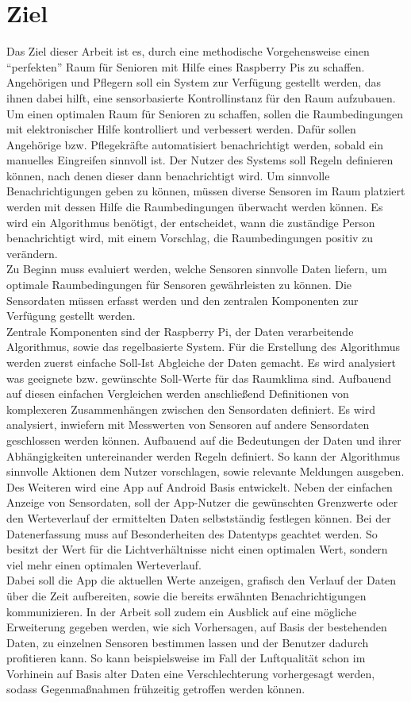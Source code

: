 \section{Ziel}
Das Ziel dieser Arbeit ist es, durch eine methodische Vorgehensweise einen ``perfekten'' Raum für Senioren mit Hilfe eines Raspberry Pis zu schaffen. Angehörigen und Pflegern soll ein System zur Verfügung gestellt werden, das ihnen dabei hilft, eine sensorbasierte Kontrollinstanz für den Raum aufzubauen.\\
Um einen optimalen Raum für Senioren zu schaffen, sollen die Raumbedingungen mit elektronischer Hilfe kontrolliert und verbessert werden.
Dafür sollen Angehörige bzw. Pflegekräfte automatisiert benachrichtigt werden, sobald ein manuelles Eingreifen sinnvoll ist. Der Nutzer des Systems soll Regeln definieren können, nach denen dieser dann benachrichtigt wird.
Um sinnvolle Benachrichtigungen geben zu können, müssen diverse Sensoren im Raum platziert werden mit dessen Hilfe die Raumbedingungen überwacht werden können. Es wird ein Algorithmus benötigt, der entscheidet, wann die zuständige Person benachrichtigt wird, mit einem Vorschlag, die Raumbedingungen positiv zu verändern.\\
Zu Beginn muss evaluiert werden, welche Sensoren sinnvolle Daten liefern, um optimale Raumbedingungen für Sensoren gewährleisten zu können. Die Sensordaten müssen erfasst werden und den zentralen Komponenten zur Verfügung gestellt werden.\\
Zentrale Komponenten sind der Raspberry Pi, der Daten verarbeitende Algorithmus, sowie das regelbasierte System.
Für die Erstellung des Algorithmus werden zuerst einfache Soll-Ist Abgleiche der Daten gemacht. Es wird analysiert was geeignete bzw. gewünschte Soll-Werte für das Raumklima sind. Aufbauend auf diesen einfachen Vergleichen werden anschließend Definitionen von komplexeren Zusammenhängen zwischen den Sensordaten definiert. Es wird analysiert, inwiefern mit Messwerten von Sensoren auf andere Sensordaten geschlossen werden können. Aufbauend auf die Bedeutungen der Daten und ihrer Abhängigkeiten untereinander werden Regeln definiert. So kann der Algorithmus sinnvolle Aktionen dem Nutzer vorschlagen, sowie relevante Meldungen ausgeben.\\
Des Weiteren wird eine App auf Android Basis entwickelt. Neben der einfachen Anzeige von Sensordaten, soll der App-Nutzer die gewünschten Grenzwerte oder den Werteverlauf der ermittelten Daten selbstständig festlegen können. Bei der Datenerfassung muss auf Besonderheiten des Datentyps geachtet werden. So besitzt der Wert für die Lichtverhältnisse nicht einen optimalen Wert, sondern viel mehr einen optimalen Werteverlauf.\\
Dabei soll die App die aktuellen Werte anzeigen, grafisch den Verlauf der Daten über die Zeit aufbereiten, sowie die bereits erwähnten Benachrichtigungen kommunizieren.
In der Arbeit soll zudem ein Ausblick auf eine mögliche Erweiterung gegeben werden, wie sich Vorhersagen, auf Basis der bestehenden Daten, zu einzelnen Sensoren bestimmen lassen und der Benutzer dadurch profitieren kann. So kann beispielsweise im Fall der Luftqualität schon im Vorhinein auf Basis alter Daten eine Verschlechterung vorhergesagt werden, sodass Gegenmaßnahmen frühzeitig getroffen werden können.
